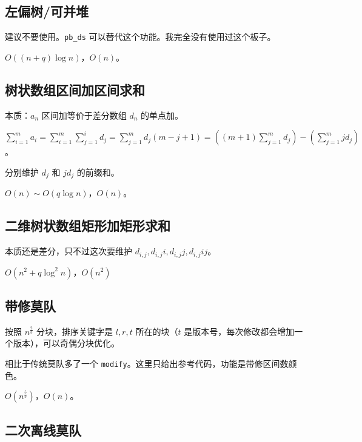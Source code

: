 \documentclass[12pt]{ctexart}
\begin{document}
\subsection{左偏树/可并堆}

建议不要使用。\verb|pb_ds| 可以替代这个功能。我完全没有使用过这个板子。

$O((n+q)\log n)$，$O(n)$。



\subsection{树状数组区间加区间求和}

本质：$a_n$ 区间加等价于差分数组 $d_n$ 的单点加。

$\sum\limits_{i=1}^ma_i =\sum\limits_{i=1}^m\sum\limits_{j=1}^id_j=\sum\limits_{j=1}^md_j(m-j+1)=((m+1)\sum\limits_{j=1}^md_j)-(\sum\limits_{j=1}^mjd_j)$。

分别维护 $d_j$ 和 $jd_j$ 的前缀和。

$O(n)\sim O(q\log n)$，$O(n)$。



\subsection{二维树状数组矩形加矩形求和}

本质还是差分，只不过这次要维护 $d_{i,j},d_{i,j}i,d_{i,j}j,d_{i,j}ij$。

$O(n^2+q\log^2n)$，$O(n^2)$



\subsection{带修莫队}

按照 $n^{\frac{2}{3}}$ 分块，排序关键字是 $l,r,t$ 所在的块（$t$ 是版本号，每次修改都会增加一个版本），可以奇偶分块优化。

相比于传统莫队多了一个 \verb|modify|。这里只给出参考代码，功能是带修区间数颜色。

$O(n^{\frac {5}{3}})$，$O(n)$。



\subsection{二次离线莫队}
\end{document}
